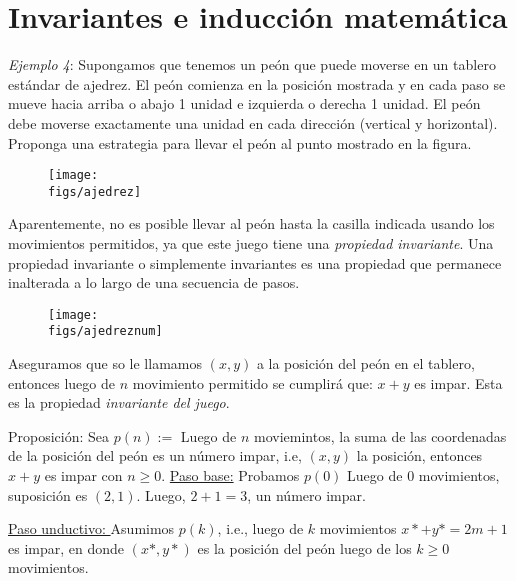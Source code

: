 \section{Invariantes e inducción matemática}
\emph{Ejemplo 4}: Supongamos que tenemos un peón que puede moverse en un tablero estándar de ajedrez. El peón comienza en la posición mostrada y en cada paso se mueve hacia arriba o abajo 1 unidad e izquierda o derecha 1 unidad. El peón debe moverse exactamente una unidad en cada dirección (vertical y horizontal). Proponga una estrategia para llevar el peón al punto mostrado en la figura.
\begin{figure}[H]
    \centering
    \texttt{[image: \\figs/ajedrez]} 
\end{figure}
Aparentemente, no es posible llevar al peón hasta la casilla indicada usando los movimientos permitidos, ya que este juego tiene una \emph{propiedad invariante}. \newline 
Una propiedad invariante o simplemente invariantes es una propiedad que permanece inalterada a lo largo de una secuencia de pasos. \newline 

\begin{figure}[H]
    \centering
    \texttt{[image: \\figs/ajedreznum]} 
\end{figure}

Aseguramos que so le llamamos $(x,y)$ a la posición del peón en el tablero, entonces luego de $n$  movimiento permitido se cumplirá que: $x+y$ es impar. \newline 
Esta es la propiedad \emph{invariante del juego}. \newline 

Proposición: Sea $p(n):=$ Luego de $n$ moviemintos, la suma de las coordenadas de la posición del peón es un número impar, i.e, $(x,y)$ la posición, entonces $x+y$ es impar con $n\geq 0$.
\newline 
\underline{Paso base:} Probamos $p(0)$ \newline 
    Luego de 0 movimientos, suposición es $(2,1)$. Luego, $2+1=3$, un número impar. \newline 

\underline{Paso unductivo: } Asumimos $p(k)$, i.e., luego de $k$ movimientos $x*+y*=2m+1$ es impar, en donde $(x*,y*)$ es la posición del peón luego de los $k\geq 0$ movimientos. \newline 

